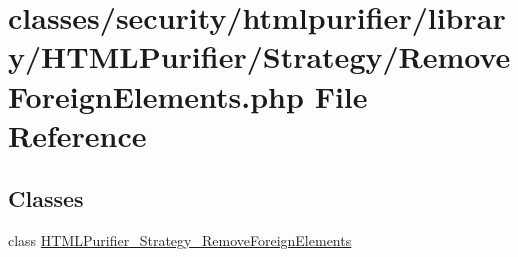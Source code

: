 \hypertarget{RemoveForeignElements_8php}{\section{classes/security/htmlpurifier/library/\+H\+T\+M\+L\+Purifier/\+Strategy/\+Remove\+Foreign\+Elements.php File Reference}
\label{RemoveForeignElements_8php}
}
\subsection*{Classes}
\begin{DoxyCompactItemize}
\item 
class \hyperlink{classHTMLPurifier__Strategy__RemoveForeignElements}{H\+T\+M\+L\+Purifier\+\_\+\+Strategy\+\_\+\+Remove\+Foreign\+Elements}
\end{DoxyCompactItemize}
